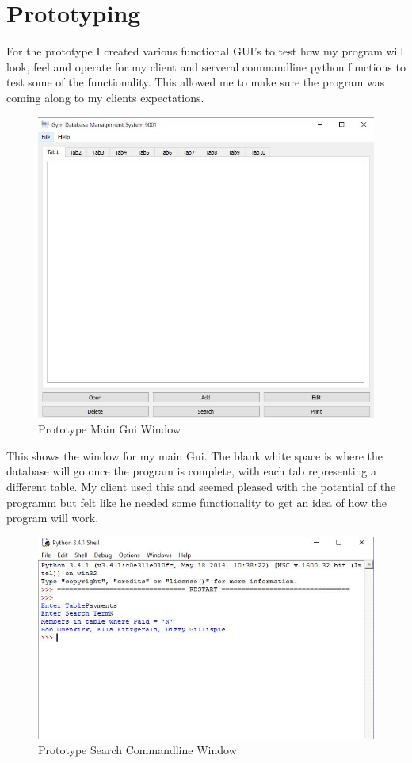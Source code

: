 \section{Prototyping}

For the prototype I created various functional GUI's to test how my program will look, feel and operate for my client and serveral commandline python functions to test some of the functionality. This allowed me to make sure the program was coming along to my clients expectations.

\begin{figure}[H]
    \includegraphics[width=\textwidth]{PrototypeGui1.JPG}
    \caption{Prototype Main Gui Window} \label{fig:Prototype Main Gui Windows}
\end{figure}

This shows the window for my main Gui. The blank white space is where the database will go once the program is complete, with each tab representing a different table. My client used this and seemed pleased with the potential of the programm but felt like he needed some functionality to get an idea of how the program will work.

\begin{figure}[H]
    \includegraphics[width=\textwidth]{PrototypeGui2.JPG}
    \caption{Prototype Search Commandline Window} \label{fig:Prototype Search Commandline Window}
\end{figure}

